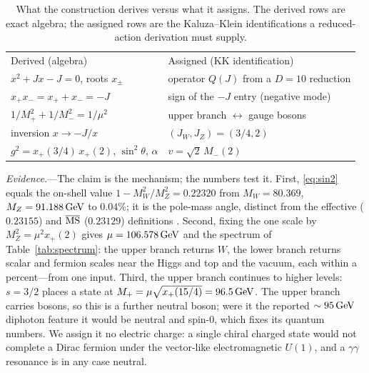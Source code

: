 \documentclass[aps,prl,reprint,superscriptaddress,nofootinbib]{revtex4-2}
\begin{document}
\begin{table}[t]
\caption{What the construction derives versus what it assigns. The derived rows
are exact algebra; the assigned rows are the Kaluza--Klein identifications a
reduced-action derivation must supply.}
\label{tab:ledger}
\begin{ruledtabular}
\footnotesize
\begin{tabular}{ll}
Derived (algebra) & Assigned (KK identification) \\
\colrule
$x^2+Jx-J=0$, roots $x_\pm$ & operator $Q(J)$ from a $D{=}10$ reduction \\
$x_+x_-=x_++x_-=-J$ & sign of the $-J$ entry (negative mode) \\
$1/M_+^2+1/M_-^2=1/\mu^2$ & upper branch $\leftrightarrow$ gauge bosons \\
inversion $x\to-J/x$ & $(J_W,J_Z)=(3/4,2)$ \\
$g^2=x_+(3/4)\,x_+(2)$, $\sin^2\theta$, $\alpha$ & $v=\sqrt2\,M_-(2)$ \\
\end{tabular}
\end{ruledtabular}
\end{table}

\textit{Evidence.}---The claim is the mechanism; the numbers test it. First,
\eqref{eq:sin2} equals the on-shell value $1-M_W^2/M_Z^2=0.22320$ from
$M_W=80.369$, $M_Z=91.188\,\mathrm{GeV}$ \cite{PDG2025} to $0.04\%$; it is the pole-mass
angle, distinct from the effective ($0.23155$) and $\overline{\mathrm{MS}}$ ($0.23129$)
definitions \cite{MartinRobertson2025}. Second, fixing the one scale by
$M_Z^2=\mu^2x_+(2)$ gives $\mu=106.578\,\mathrm{GeV}$ and the spectrum of
Table~\ref{tab:spectrum}: the upper branch returns $W$, the lower branch returns
scalar and fermion scales near the Higgs and top and the vacuum, each within a
percent---from one input. Third, the upper branch continues to higher levels:
$s=3/2$ places a state at $M_+=\mu\sqrt{x_+(15/4)}=96.5\,\mathrm{GeV}$. The upper branch
carries bosons, so this is a further neutral boson; were it the reported
$\sim95\,\mathrm{GeV}$ diphoton feature \cite{Biekotter2023} it would be neutral and
spin-$0$, which fixes its quantum numbers. We assign it no electric charge: a
single chiral charged state would not complete a Dirac fermion under the
vector-like electromagnetic $U(1)$, and a $\gamma\gamma$ resonance is in any case
neutral.
\end{document}
